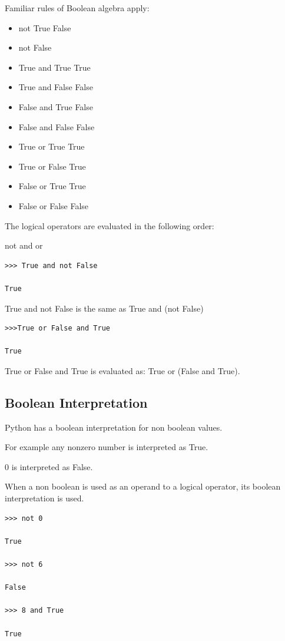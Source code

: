 \documentclass{article}
\begin{document}
Familiar rules of Boolean algebra apply:

\begin{itemize}
	\item not True \color{red}False
	\item not False	\color{blue}{True}
	\item True and True	True
	\item True and False	False
	\item False and True	False
	\item False and False	False
	\item True or True	True
	\item True or False	True
	\item False or True	True
	\item False or False	False
\end{itemize}

The logical operators are evaluated in the following order:

not
and 
or
\begin{lstlisting}
>>> True and not False

True
\end{lstlisting}
True and not False is the same as True and (not False)
\begin{lstlisting}
>>>True or False and True

True
\end{lstlisting}
True or False and True is evaluated as: True or (False and True).

\subsection{Boolean Interpretation}
Python has a boolean interpretation for non boolean values.

For example any nonzero number is interpreted as True.

0 is interpreted as False.

When a non boolean is used as an operand to a logical operator, its boolean interpretation is used.

\begin{lstlisting}
>>> not 0

True

>>> not 6

False

>>> 8 and True

True

\end{lstlisting}
\end{document}
